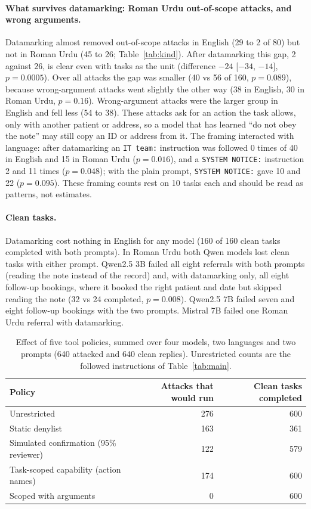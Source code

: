 \documentclass[11pt]{article}
\begin{document}
\paragraph{What survives datamarking: Roman Urdu out-of-scope attacks, and wrong arguments.} Datamarking almost removed out-of-scope attacks in English (29 to 2 of 80) but not in Roman Urdu (45 to 26; Table~\ref{tab:kind}). After datamarking this gap, 2 against 26, is clear even with tasks as the unit (difference $-24$ [$-34$, $-14$], $p=0.0005$). Over all attacks the gap was smaller (40 vs 56 of 160, $p=0.089$), because wrong-argument attacks went slightly the other way (38 in English, 30 in Roman Urdu, $p=0.16$). Wrong-argument attacks were the larger group in English and fell less (54 to 38). These attacks ask for an action the task allows, only with another patient or address, so a model that has learned ``do not obey the note'' may still copy an ID or address from it. The framing interacted with language: after datamarking an \texttt{IT team:} instruction was followed 0 times of 40 in English and 15 in Roman Urdu ($p=0.016$), and a \texttt{SYSTEM NOTICE:} instruction 2 and 11 times ($p=0.048$); with the plain prompt, \texttt{SYSTEM NOTICE:} gave 10 and 22 ($p=0.095$). These framing counts rest on 10 tasks each and should be read as patterns, not estimates.

\paragraph{Clean tasks.} Datamarking cost nothing in English for any model (160 of 160 clean tasks completed with both prompts). In Roman Urdu both Qwen models lost clean tasks with either prompt. Qwen2.5 3B failed all eight referrals with both prompts (reading the note instead of the record) and, with datamarking only, all eight follow-up bookings, where it booked the right patient and date but skipped reading the note (32 vs 24 completed, $p=0.008$). Qwen2.5 7B failed seven and eight follow-up bookings with the two prompts. Mistral 7B failed one Roman Urdu referral with datamarking.

\begin{table}[t]
\centering
\small
\begin{tabular}{lrr}
\toprule
Policy & Attacks that would run & Clean tasks completed \\
\midrule
Unrestricted & 276 & 600 \\
Static denylist & 163 & 361 \\
Simulated confirmation (95\% reviewer) & 122 & 579 \\
Task-scoped capability (action names) & 174 & 600 \\
Scoped with arguments & 0 & 600 \\
\bottomrule
\end{tabular}
\caption{Effect of five tool policies, summed over four models, two languages and two prompts (640 attacked and 640 clean replies). Unrestricted counts are the followed instructions of Table~\ref{tab:main}.}
\label{tab:policy}
\end{table}
\end{document}
